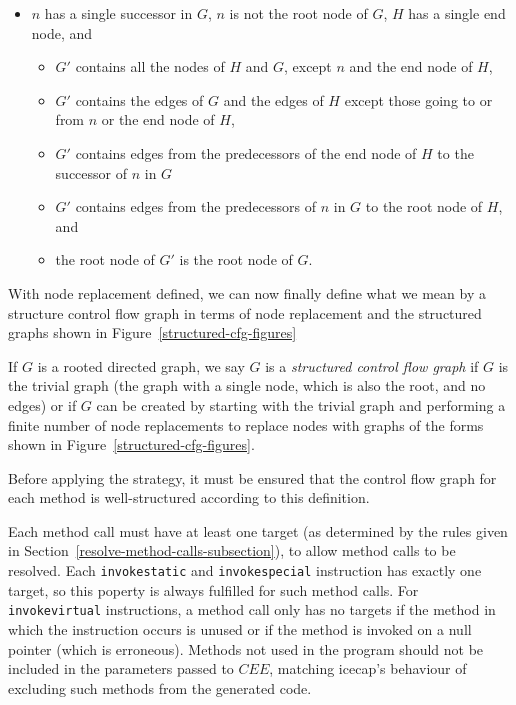\begin{defn}
\begin{itemize}
\begin{itemize}
    \end{itemize}
  \item $n$ has a single successor in $G$, $n$ is not the root node of
    $G$, $H$ has a single end node, and
    \begin{itemize}
    \item $G'$ contains all the nodes of $H$ and $G$, except $n$ and
      the end node of $H$,
    \item $G'$ contains the edges of $G$ and the edges of $H$ except
      those going to or from $n$ or the end node of $H$,
    \item $G'$ contains edges from the predecessors of the end node of
      $H$ to the successor of $n$ in $G$
    \item $G'$ contains edges from the predecessors of $n$ in $G$ to
      the root node of $H$, and
    \item the root node of $G'$ is the root node of $G$.
    \end{itemize}
  \end{itemize}
\end{defn}

With node replacement defined, we can now finally define what we mean
by a structure control flow graph in terms of node replacement and the
structured graphs shown in Figure~\ref{structured-cfg-figures}

\begin{defn}
  If $G$ is a rooted directed graph, we say $G$ is a \emph{structured
    control flow graph} if $G$ is the trivial graph (the graph with a
  single node, which is also the root, and no edges) or if $G$ can be
  created by starting with the trivial graph and performing a finite
  number of node replacements to replace nodes with graphs of the
  forms shown in Figure~\ref{structured-cfg-figures}.
\end{defn}

Before applying the strategy, it must be ensured that the control flow
graph for each method is well-structured according to this definition.

Each method call must have at least one target (as
determined by the rules given in
Section~\ref{resolve-method-calls-subsection}), to allow method calls
to be resolved.
Each \texttt{invokestatic} and \texttt{invokespecial} instruction has
exactly one target, so this poperty is always fulfilled for such
method calls.
For \texttt{invokevirtual} instructions, a method call only has no
targets if the method in which the instruction occurs is unused or if
the method is invoked on a null pointer (which is erroneous).
Methods not used in the program should not be included in the
parameters passed to $CEE$, matching icecap's behaviour of excluding
such methods from the generated code.

